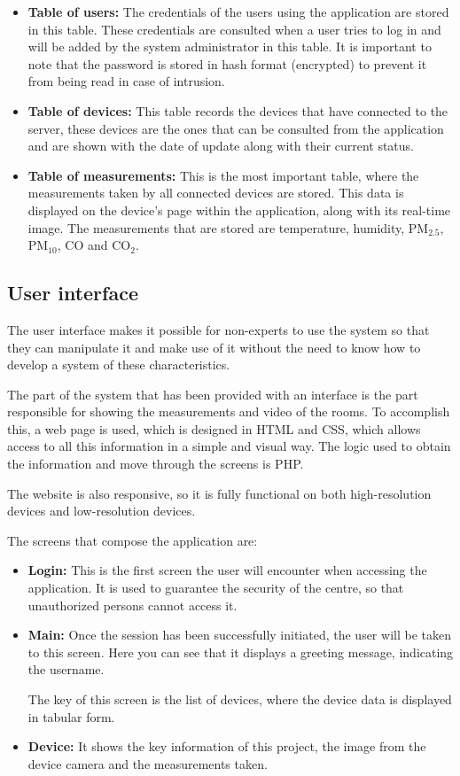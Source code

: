 \begin{itemize}
	\item \textbf{Table of users:} The credentials of the users using the application are stored in this table. These credentials are consulted when a user tries to log in and will be added by the system administrator in this table. It is important to note that the password is stored in hash format (encrypted) to prevent it from being read in case of intrusion.
	\item \textbf{Table of devices:} This table records the devices that have connected to the server, these devices are the ones that can be consulted from the application and are shown with the date of update along with their current status.
	\item \textbf{Table of measurements:} This is the most important table, where the measurements taken by all connected devices are stored. This data is displayed on the device's page within the application, along with its real-time image. The measurements that are stored are temperature, humidity, PM$_{2.5}$, PM$_{10}$, CO and CO$_2$.
\end{itemize}

\subsection{User interface}\label{subsec:user-interface}
The user interface makes it possible for non-experts to use the system so that they can manipulate it and make use of it without the need to know how to develop a system of these characteristics.

The part of the system that has been provided with an interface is the part responsible for showing the measurements and video of the rooms. To accomplish this, a web page is used, which is designed in HTML and CSS, which allows access to all this information in a simple and visual way. The logic used to obtain the information and move through the screens is PHP\@.

The website is also responsive, so it is fully functional on both high-resolution devices and low-resolution devices.

The screens that compose the application are:
\begin{itemize}
	\item \textbf{Login:} This is the first screen the user will encounter when accessing the application. It is used to guarantee the security of the centre, so that unauthorized persons cannot access it.
	\item \textbf{Main:} Once the session has been successfully initiated, the user will be taken to this screen. Here you can see that it displays a greeting message, indicating the username.

	The key of this screen is the list of devices, where the device data is displayed in tabular form.
	\item \textbf{Device:} It shows the key information of this project, the image from the device camera and the measurements taken.
\end{itemize}


